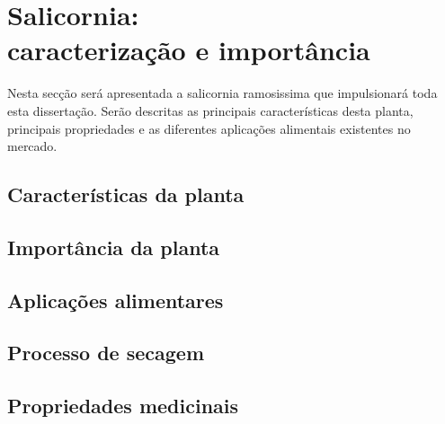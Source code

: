 
\chapter{Salicornia:\\ caracterização e importância}


Nesta secção será apresentada a salicornia ramosissima que impulsionará toda esta dissertação. Serão descritas as principais características desta planta, principais propriedades e as diferentes aplicações alimentais existentes no mercado. 

\section{Características da planta}



\cite{Toz}
\cite{Jose12}
\cite{Z}

\section{Importância da planta}


\section{Aplicações alimentares}

\section{Processo de secagem}

\section{Propriedades medicinais}











